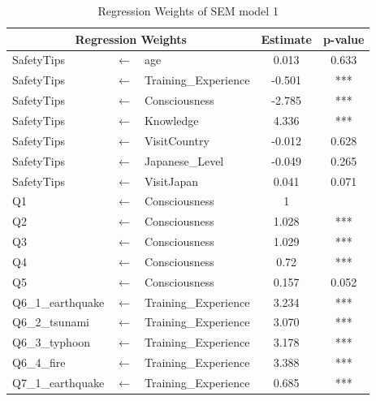 \begin{table}[h]
  \caption{Regression Weights of SEM model 1 }
  \label{table9}
  \centering
  \begin{tabular}{lcl|c|c}
 \hline
 \multicolumn{3}{c|}{Regression Weights} & Estimate & p-value \\
 \hline
SafetyTips              &$\longleftarrow$ & age                  & 0.013  & 0.633                \\
SafetyTips              &$\longleftarrow$ & Training\_Experience & -0.501 & ***                  \\
SafetyTips              &$\longleftarrow$ & Consciousness        & -2.785 & ***                  \\
SafetyTips              &$\longleftarrow$ & Knowledge            & 4.336  & ***                  \\
SafetyTips              &$\longleftarrow$ & VisitCountry         & -0.012 & 0.628                \\
SafetyTips              &$\longleftarrow$ & Japanese\_Level      & -0.049 & 0.265                \\
SafetyTips              &$\longleftarrow$ & VisitJapan           & 0.041  & 0.071                \\
Q1                      &$\longleftarrow$ & Consciousness        & 1      &  \\
Q2                      &$\longleftarrow$ & Consciousness        & 1.028  & ***                  \\
Q3                      &$\longleftarrow$ & Consciousness        & 1.029  & ***                  \\
Q4                      &$\longleftarrow$ & Consciousness        & 0.72   & ***                  \\
Q5                      &$\longleftarrow$ & Consciousness        & 0.157  & 0.052                \\
Q6\_1\_earthquake       &$\longleftarrow$ & Training\_Experience & 3.234  & ***                  \\
Q6\_2\_tsunami          &$\longleftarrow$ & Training\_Experience & 3.070   & ***                  \\
Q6\_3\_typhoon          &$\longleftarrow$ & Training\_Experience & 3.178  & ***                  \\
Q6\_4\_fire             &$\longleftarrow$ & Training\_Experience & 3.388  & ***                  \\
Q7\_1\_earthquake       &$\longleftarrow$ & Training\_Experience & 0.685  & ***                  \\

\end{tabular}
\end{table}
